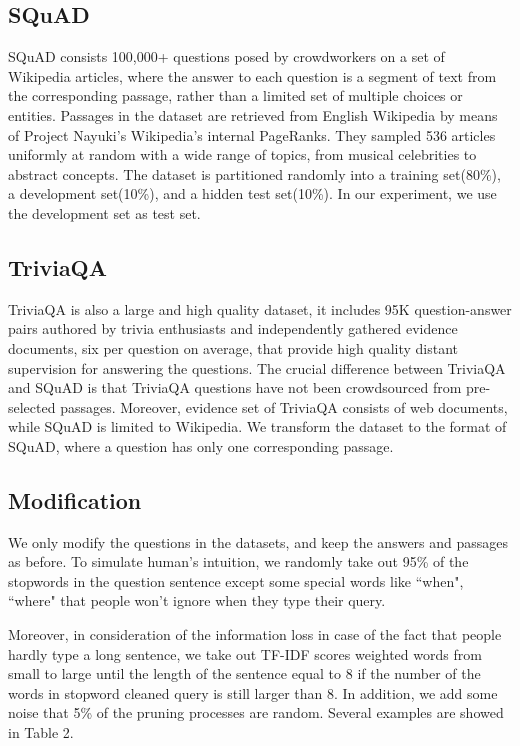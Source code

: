 \documentclass[sigconf]{acmart}
\begin{document}
\subsection{SQuAD}
SQuAD consists 100,000+ questions posed by crowdworkers on a set of Wikipedia articles, where the answer to each question is a segment of text from the corresponding passage, rather than a limited set of multiple choices or entities. Passages in the dataset are retrieved from English Wikipedia by means of Project Nayuki's Wikipedia's internal PageRanks. They sampled 536 articles uniformly at random with a wide range of topics, from musical celebrities to abstract concepts. The dataset is partitioned randomly into a training set(80\%), a development set(10\%), and a hidden test set(10\%). In our experiment, we use the development set as test set.
 

 
\subsection{TriviaQA}
TriviaQA is also a large and high quality dataset, it includes 95K question-answer pairs authored by trivia enthusiasts and independently gathered evidence documents, six per question on average, that provide high quality distant supervision for answering the questions. The crucial difference between TriviaQA and SQuAD is that TriviaQA questions have not been crowdsourced from pre-selected passages. Moreover, evidence set of TriviaQA consists of web documents, while SQuAD is limited to Wikipedia\cite{pan2017memen}. We transform the dataset to the format of SQuAD, where a question has only one corresponding passage.



\subsection{Modification}
We only modify the questions in the datasets, and keep the answers and passages as before. To simulate human's intuition, we randomly take out 95\% of the stopwords in the question sentence except some special words like ``when", ``where" that people won't ignore when they type their query. 



Moreover, in consideration of the information loss in case of the fact that people hardly type a long sentence, we take out TF-IDF scores weighted words from small to large until the length of the sentence equal to 8 if the number of the words in stopword cleaned query is still larger than 8. In addition, we add some noise that 5\% of the pruning processes are random. Several examples are showed in Table 2. 
\end{document}
